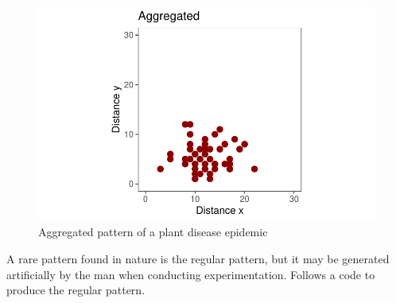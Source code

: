 \documentclass[
  letterpaper,
  DIV=11,
  numbers=noendperiod]{scrreprt}
\begin{document}
\begin{figure}[H]

{\centering \includegraphics{spatial-patterns_files/figure-pdf/fig-aggregated-1.pdf}

}

\caption{\label{fig-aggregated}Aggregated pattern of a plant disease
epidemic}

\end{figure}

A rare pattern found in nature is the regular pattern, but it may be
generated artificially by the man when conducting experimentation.
Follows a code to produce the regular pattern.
\end{document}

